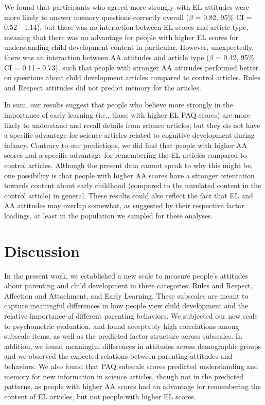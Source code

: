 \documentclass[floatsintext,man]{apa6}
\theoremstyle{definition}
\theoremstyle{definition}
\theoremstyle{definition}
\theoremstyle{remark}
\begin{document}
We found that participants who agreed more strongly with EL attitudes
were more likely to answer memory questions correctly overall (\(\beta\)
= 0.82, 95\% CI = 0.52 - 1.14), but there was no interaction between EL
scores and article type, meaning that there was no advantage for people
with higher EL scores for understanding child development content in
particular. However, unexpectedly, there was an interaction between AA
attitudes and article type (\(\beta\) = 0.42, 95\% CI = 0.11 - 0.73),
such that people with stronger AA attitudes performed better on
questions about child development articles compared to control articles.
Rules and Respect attitudes did not predict memory for the articles.

In sum, our results suggest that people who believe more strongly in the
importance of early learning (i.e., those with higher EL PAQ scores) are
more likely to understand and recall details from science articles, but
they do not have a specific advantage for science articles related to
cognitive development during infancy. Contrary to our predictions, we
did find that people with higher AA scores had a specific advantage for
remembering the EL articles compared to control articles. Although the
present data cannot speak to why this might be, one possibility is that
people with higher AA scores have a stronger orientation towards content
about early childhood (compared to the unrelated content in the control
article) in general. These results could also reflect the fact that EL
and AA attitudes may overlap somewhat, as suggested by their respective
factor loadings, at least in the population we sampled for these
analyses.

\section{Discussion}\label{discussion}

In the present work, we established a new scale to measure people's
attitudes about parenting and child development in three categories:
Rules and Respect, Affection and Attachment, and Early Learning. These
subscales are meant to capture meaningful differences in how people view
child development and the relative importance of different parenting
behaviors. We subjected our new scale to psychometric evaluation, and
found acceptably high correlations among subscale items, as well as the
predicted factor structure across subscales. In addition, we found
meaningful differences in attitudes across demographic groups and we
observed the expected relations between parenting attitudes and
behaviors. We also found that PAQ subscale scores predicted
understanding and memory for new information in science articles, though
not in the predicted patterns, as people with higher AA scores had an
advantage for remembering the content of EL articles, but not people
with higher EL scores.
\end{document}

